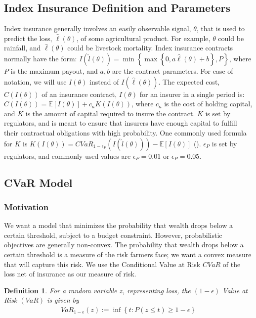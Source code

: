 \documentclass[11pt]{article}
\makeatletter
\newtheorem{defn}[lemma]{Definition}
\renewcommand\paragraph{\@startsection{paragraph}{5}{\z@}%
  {3.25ex \@plus1ex \@minus.2ex}%
  {-1em}%
  {\normalfont\normalsize\bfseries}}
\makeatother
\begin{document}
  \subsection{Index Insurance Definition and Parameters}
    Index insurance generally involves an easily observable signal, $\theta$, that is used to predict the loss, $\hat{\ell}(\theta)$, of some agricultural product. For example, $\theta$ could be rainfall, and $\hat{\ell}(\theta)$ could be livestock mortality. Index insurance contracts normally have the form: $I(\hat{l}(\theta)) = \min \left \{\max \left \{0,a\hat{\ell}(\theta) + b \right \}, P \right \}$, where $P$ is the maximum payout, and $a,b$ are the contract parameters. For ease of notation, we will use $I(\theta)$ instead of $I(\hat{\ell}(\theta))$. The expected cost, $C(I(\theta))$ of an insurance contract, $I(\theta)$ for an insurer in a single period is: $C(I(\theta)) = \mathbb{E}[I(\theta)] + c_{\kappa} K(I(\theta))$, where $c_{\kappa}$ is the cost of holding capital, and $K$ is the amount of capital required to insure the contract. $K$ is set by regulators, and is meant to ensure that insurers have enough capital to fulfill their contractual obligations with high probability. One commonly used formula for $K$ is $K(I(\theta)) = CVaR_{1-\epsilon_P}\left ( I(\hat{l}(\theta)) \right ) - \mathbb{E}[I(\theta)]$ (\cite{mapfumo2017risk}). $\epsilon_P$ is set by regulators, and commonly used values are $\epsilon_P = 0.01$ or $\epsilon_P = 0.05$.  

  \subsection{CVaR Model}
    \subsubsection{Motivation}
      We want a model that minimizes the probability that wealth drops below a certain threshold, subject to a budget constraint. However, probabilistic objectives are generally non-convex. The probability that wealth drops below a certain threshold is a measure of the risk farmers face; we want a convex measure that will capture this risk. We use the Conditional Value at Risk $CVaR$ of the loss net of insurance as our measure of risk. 
  
    \begin{defn}
      For a random variable $z$, representing loss, the $(1-\epsilon)$ Value at Risk $(VaR)$ is given by 
      \begin{align*}
        VaR_{1-\epsilon}(z) := \inf \left \{ t : P(z \leq t) \geq 1-\epsilon \right \}
      \end{align*}
    \end{defn}
  
\end{document}
